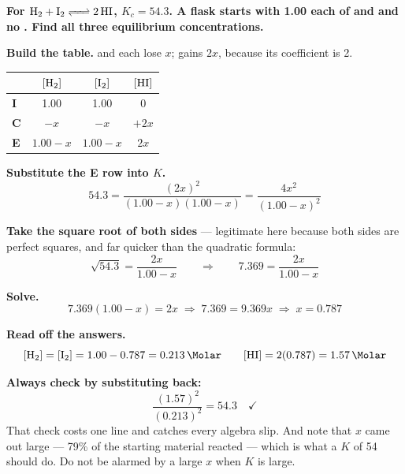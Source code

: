 \documentclass{apchem-worksheet}
\begin{document}
\begin{workedexample}
\textbf{For $\ce{H2 + I2 <=> 2HI}$, $K_{c} = 54.3$. A flask starts with
\SI{1.00}{\Molar} each of  and  and no . Find all
three equilibrium concentrations.}

\textbf{Build the table.}  and  each lose $x$; 
gains $2x$, because its coefficient is 2.

\begin{center}
\renewcommand{\arraystretch}{1.25}
\begin{tabular}{@{}lccc@{}}
\toprule
& $[\ce{H2}]$ & $[\ce{I2}]$ & $[\ce{HI}]$ \\
\midrule
\textbf{I} & 1.00 & 1.00 & 0 \\
\textbf{C} & $-x$ & $-x$ & $+2x$ \\
\textbf{E} & $1.00-x$ & $1.00-x$ & $2x$ \\
\bottomrule
\end{tabular}
\end{center}

\textbf{Substitute the E row into $K$.}
\[ 54.3 = \frac{(2x)^{2}}{(1.00-x)(1.00-x)}
        = \frac{4x^{2}}{(1.00-x)^{2}} \]

\textbf{Take the square root of both sides} --- legitimate here because
both sides are perfect squares, and far quicker than the quadratic
formula:
\[ \sqrt{54.3} = \frac{2x}{1.00-x}
   \qquad\Longrightarrow\qquad
   7.369 = \frac{2x}{1.00-x} \]

\textbf{Solve.}
\[ 7.369(1.00-x) = 2x
   \;\Longrightarrow\;
   7.369 = 9.369x
   \;\Longrightarrow\;
   x = 0.787 \]

\textbf{Read off the answers.}
\[ [\ce{H2}] = [\ce{I2}] = 1.00 - 0.787 = \SI{0.213}{\Molar}
   \qquad
   [\ce{HI}] = 2(0.787) = \SI{1.57}{\Molar} \]

\textbf{Always check by substituting back:}
\[ \frac{(1.57)^{2}}{(0.213)^{2}} = 54.3 \quad\checkmark \]
That check costs one line and catches every algebra slip. And note that
$x$ came out large --- 79\% of the starting material reacted --- which
is what a $K$ of 54 should do. Do not be alarmed by a large $x$ when $K$
is large.
\end{workedexample}
\end{document}
